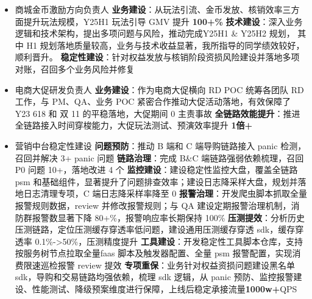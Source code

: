 \documentclass[11pt,a4paper]{moderncv}
\begin{document}
{\begin{itemize}
        \item \textcolor[RGB]{64,127,191}{商城金币激励方向负责人 }
        \newline \textbf{业务建设}：从玩法引流、金币发放、核销效率三方面提升玩法规模，Y25H1 玩法引导 GMV 提升 \textbf{100+\%}
        \newline \textbf{技术建设}：深入业务逻辑和技术架构，提出多项问题与风险，推动完成Y25H1 \& Y25H2 规划， 其中 H1 规划落地质量较高，业务与技术收益显著，我所指导的同学绩效较好，顺利晋升。
        \newline \textbf{稳定性建设}：针对权益发放与核销阶段资损风险建设并落地多项对账，召回多个业务风险并修复
         \item \textcolor[RGB]{64,127,191}{电商大促研发负责人}
        \newline \textbf{业务建设}：作为电商大促横向 RD POC 统筹各团队 RD 工作，与 PM、QA、业务 POC 紧密合作推动大促活动落地，有效保障了 Y23 618 和 双 11 的平稳落地，大促期间 0 主责事故
        \newline \textbf{全链路效能提升}：推进全链路接入时间穿梭能力，大促玩法测试、预演效率提升 \textbf{1倍+}
        \item \textcolor[RGB]{64,127,191}{营销中台稳定性建设}
        \newline \textbf{问题预防}：推动 B 端和 C 端导购链路接入 panic 检测，召回并解决 3+ panic 问题
        \newline \textbf{链路治理}：完成 B\&C 端链路强弱依赖梳理，召回 P0 问题 10+，落地改进 4 个
        \newline \textbf{监控建设}：建设稳定性监控大盘，覆盖全链路 psm 和基础组件，显著提升了问题排查效率；建设日志降采样大盘，规划并落地日志清理专项，C 端日志降采样率降至 0
        \newline \textbf{报警治理}：开发爬虫脚本抓取全量报警规则数据，review 并修改报警规则；与 QA 建设定期报警治理机制，消防群报警数显著下降 80+\%，报警响应率长期保持 100\%
        \newline \textbf{压测提效}：分析历史压测链路，定位压测缓存穿透率低问题，建设通用压测缓存穿透 sdk，缓存穿透率 0.1\%->50\%，压测精度提升
        \newline \textbf{工具建设}：开发稳定性工具脚本仓库，支持按服务树节点拉取全量faas 脚本及触发器配置、全量 psm 报警配置，实现消费限速巡检报警 review 提效
        \newline \textbf{专项重保}：业务针对权益资损问题建设黑名单 sdk，导购和交易链路均强依赖，梳理 sdk 逻辑，从 panic 预防、监控报警建设、性能测试、降级预案维度进行保障，上线后稳定承接流量\textbf{1000w+}QPS
    \end{itemize}}
\end{document}
